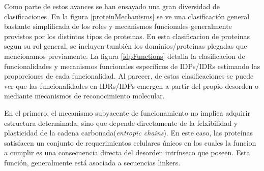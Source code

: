 
Como parte de estos avances se han ensayado una gran diversidad de clasificaciones\cite{van2014classification}.
En la figura \ref{proteinMechanisms} se ve una clasificación general bastante simplificada de los roles y mecanismos funcionales generalmente provistos por los distintos tipos de proteinas. 
En esta clasificacion de proteinas segun su rol general, se incluyen también los dominios/proteinas plegadas que mencionamos previamente.
La figura \ref{idpFunctions} detalla la clasificacion de funcionalidades y mecanismos funcionales específicos de IDPs/IDRs estimando las proporciones de cada funcionalidad.
Al parecer, de estas clasificaciones se puede ver que las funcionalidades en IDRs/IDPs emergen a partir del propio desorden o mediante mecanismos de reconocimiento molecular.

En el primero, el mecanismo subyacente de funcionamiento no implica adquirir estructura determinada, sino que depende directamente de la felxibilidad y plasticidad de la cadena carbonada(\textit{entropic chains}).
En este caso, las proteínas satisfacen un conjunto de requerimientos celulares únicos en los cuales la funcion a cumplir es una consecuencia directa del desorden intrínseco que poseen. 
Esta función, generalmente está asociada a secuencias linkers.

